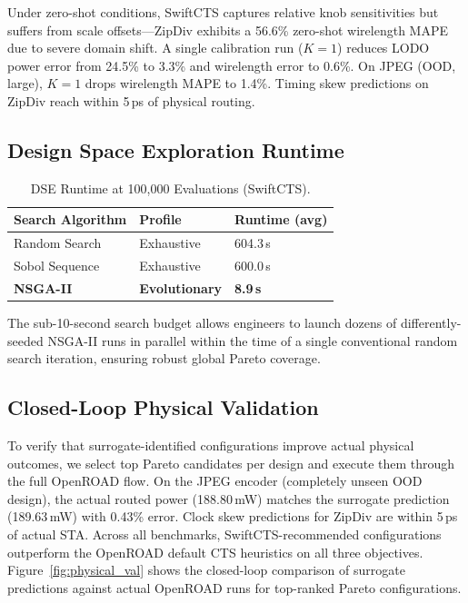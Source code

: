 \documentclass[acmsmall,review,anonymous]{acmart}
\begin{document}
\noindent
Under zero-shot conditions, SwiftCTS captures relative knob sensitivities
but suffers from scale offsets---ZipDiv exhibits a 56.6\% zero-shot
wirelength MAPE due to severe domain shift.
A single calibration run ($K=1$) reduces LODO power error from 24.5\% to
3.3\% and wirelength error to 0.6\%.
On JPEG (OOD, large), $K=1$ drops wirelength MAPE to 1.4\%.
Timing skew predictions on ZipDiv reach within 5\,ps of physical routing.

\subsection{Design Space Exploration Runtime}

\begin{table}[htbp]
\centering
\small
\caption{DSE Runtime at 100,000 Evaluations (SwiftCTS).}
\label{tab:runtime}
\begin{tabular}{lll}
\toprule
\textbf{Search Algorithm} & \textbf{Profile} & \textbf{Runtime (avg)} \\
\midrule
Random Search  & Exhaustive  & 604.3\,s \\
Sobol Sequence & Exhaustive  & 600.0\,s \\
\textbf{NSGA-II} & \textbf{Evolutionary} & \textbf{8.9\,s} \\
\bottomrule
\end{tabular}
\end{table}

\noindent
The sub-10-second search budget allows engineers to launch dozens of
differently-seeded NSGA-II runs in parallel within the time of a single
conventional random search iteration, ensuring robust global Pareto coverage.

\subsection{Closed-Loop Physical Validation}

To verify that surrogate-identified configurations improve actual physical
outcomes, we select top Pareto candidates per design and execute them through
the full OpenROAD flow.
On the JPEG encoder (completely unseen OOD design), the actual routed power
(188.80\,mW) matches the surrogate prediction (189.63\,mW) with 0.43\% error.
Clock skew predictions for ZipDiv are within 5\,ps of actual STA.
Across all benchmarks, SwiftCTS-recommended configurations outperform the
OpenROAD default CTS heuristics on all three objectives.
Figure~\ref{fig:physical_val} shows the closed-loop comparison of surrogate
predictions against actual OpenROAD runs for top-ranked Pareto configurations.
\end{document}

